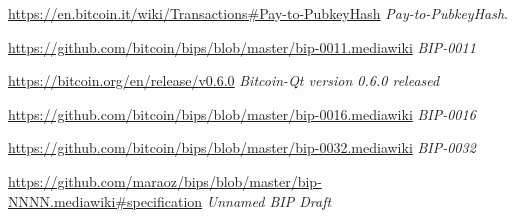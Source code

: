 \documentclass{article}
\begin{document}
\begin{thebibliography}{9}

  \url{https://en.bitcoin.it/wiki/Transactions#Pay-to-PubkeyHash}
  \emph{Pay-to-PubkeyHash}.

  \url{https://github.com/bitcoin/bips/blob/master/bip-0011.mediawiki}
  \emph{BIP-0011}

  \url{https://bitcoin.org/en/release/v0.6.0}
  \emph{Bitcoin-Qt version 0.6.0 released}

  \url{https://github.com/bitcoin/bips/blob/master/bip-0016.mediawiki}
  \emph{BIP-0016}

  \url{https://github.com/bitcoin/bips/blob/master/bip-0032.mediawiki}
  \emph{BIP-0032}

  \url{https://github.com/maraoz/bips/blob/master/bip-NNNN.mediawiki#specification}
  \emph{Unnamed BIP Draft}

\end{thebibliography}
\end{document}
